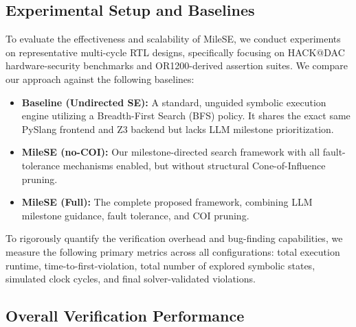 \documentclass[conference]{IEEEtran}
\begin{document}
\subsection{Experimental Setup and Baselines}
To evaluate the effectiveness and scalability of MileSE, we conduct experiments on representative multi-cycle RTL designs, specifically focusing on HACK@DAC hardware-security benchmarks and OR1200-derived assertion suites. We compare our approach against the following baselines:
\begin{itemize}
    \item \textbf{Baseline (Undirected SE):} A standard, unguided symbolic execution engine utilizing a Breadth-First Search (BFS) policy. It shares the exact same PySlang frontend and Z3 backend but lacks LLM milestone prioritization.
    \item \textbf{MileSE (no-COI):} Our milestone-directed search framework with all fault-tolerance mechanisms enabled, but without structural Cone-of-Influence pruning.
    \item \textbf{MileSE (Full):} The complete proposed framework, combining LLM milestone guidance, fault tolerance, and COI pruning.
\end{itemize}

To rigorously quantify the verification overhead and bug-finding capabilities, we measure the following primary metrics across all configurations: total execution runtime, time-to-first-violation, total number of explored symbolic states, simulated clock cycles, and final solver-validated violations. 


\subsection{Overall Verification Performance}
\label{subsec:eval_overall}

\begin{table}[htbp]
    \centering
    \caption{Overall performance comparison between Baseline, MileSE (no-COI), and MileSE (Full) across various benchmarks. (T.O. = Time Out)}
    \label{tab:main_results}
\end{table}
\end{document}
